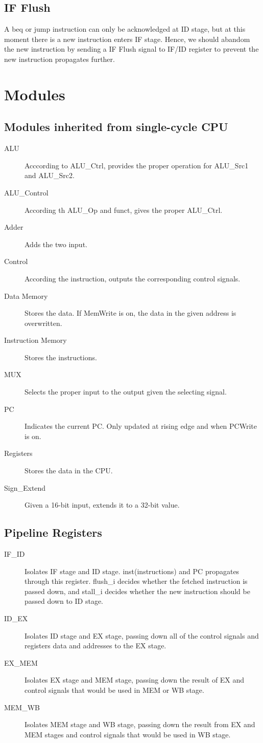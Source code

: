 \documentclass{article}
\begin{document}
\subsection{IF Flush}
A {\cs beq} or {\cs jump} instruction can only be acknowledged at ID stage, but at this moment there is a new instruction enters IF stage.
Hence, we should abandom the new instruction by sending a {\cs IF Flush} signal to {\cs IF/ID register} to prevent the new instruction propagates further.

\section{Modules}
\subsection{Modules inherited from single-cycle CPU}
\begin{description}
\item [ALU] Acccording to {\cs ALU\_Ctrl}, provides the proper operation for {\cs ALU\_Src1 and ALU\_Src2}.
\item [ALU\_Control] According th {\cs ALU\_Op} and {\cs funct}, gives the proper {\cs ALU\_Ctrl}.
\item [Adder] Adds the two input.
\item [Control] According the instruction, outputs the corresponding control signals.
\item [Data Memory] Stores the data. If {\cs MemWrite} is on, the data in the given address is overwritten.
\item [Instruction Memory] Stores the instructions.
\item [MUX] Selects the proper input to the output given the selecting signal.
\item [PC] Indicates the current PC. Only updated at rising edge and when {\cs PCWrite} is on.
\item [Registers] Stores the data in the CPU.
\item [Sign\_Extend] Given a 16-bit input, extends it to a 32-bit value.
\end{description}
\subsection{Pipeline Registers}
\begin{description}
\item [IF\_ID] Isolates IF stage and ID stage. {\cs inst}(instructions) and {\cs PC} propagates through this register. 
    {\cs flush\_i} decides whether the fetched instruction is passed down, and {\cs stall\_i} decides whether the new instruction should be passed down to ID stage.
\item [ID\_EX] Isolates ID stage and EX stage, passing down all of the control signals and registers data and addresses to the EX stage.
\item [EX\_MEM] Isolates EX stage and MEM stage, passing down the result of EX and control signals that would be used in MEM or WB stage.
\item [MEM\_WB] Isolates MEM stage and WB stage, passing down the result from EX and MEM stages and control signals that would be used in WB stage.
\end{description}
\end{document}
